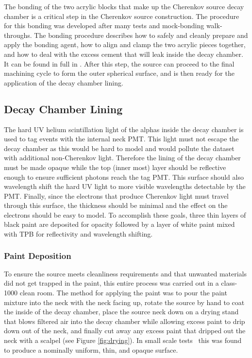 The bonding of the two acrylic blocks that make up the Cherenkov source decay chamber is a critical step in the Cherenkov source construction. 
The procedure for this bonding was developed after many tests and mock-bonding walk-throughs. 
The bonding procedure describes how to safely and cleanly prepare and apply the bonding agent, how to align and clamp the two acrylic pieces together, and how to deal with the excess cement that will leak inside the decay chamber.
It can be found in full in .
After this step, the source can proceed to the final machining cycle to form the outer spherical surface, and is then ready for the application of the decay chamber lining.

\subsection{Decay Chamber Lining}
\label{sec:lining}

The hard UV helium scintillation light of the alphas inside the decay chamber is used to tag events with the internal neck PMT. 
This light must not escape the decay chamber as this would be hard to model and would pollute the dataset with additional non-Cherenkov light. 
Therefore the lining of the decay chamber must be made opaque while the top (inner most) layer should be reflective enough to ensure sufficient photons reach the tag PMT. 
This surface should also wavelength shift the hard UV light to more visible wavelengths detectable by the PMT.
Finally, since the electrons that produce Cherenkov light must travel through this surface, the thickness should be minimal and the effect on the electrons should be easy to model. 
To accomplish these goals, three thin layers of black paint are deposited for opacity followed by a layer of white paint mixed with TPB for reflectivity and wavelength shifting. 


\subsubsection{Paint Deposition}

To ensure the source meets cleanliness requirements and that unwanted materials did not get trapped in the paint, this entire process was carried out in a class-1000 clean room.
The method for applying the paint was to pour the paint mixture into the neck with the neck facing up, rotate the source by hand to coat the inside of the decay chamber, place the source neck down on a drying stand that blows filtered air into the decay chamber while allowing excess paint to drip down out of the neck, and finally cut away any excess paint that dripped out the neck with a scalpel (see Figure \ref{fig:drying}). 
In small scale tests~\cite{tanner:2014} this was found to produce a nominally uniform, thin, and opaque surface.


